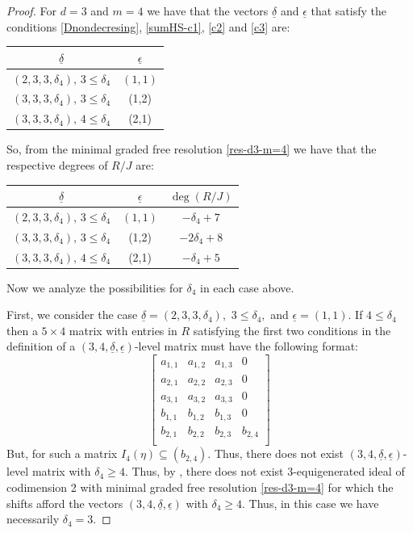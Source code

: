 \documentclass[11pt]{amsart} %
\theoremstyle{definition}
\begin{document}
	\begin{proof}   For $d=3$ and $m=4$ we have that the vectors $\underline{\delta}$ and  $\underline{\epsilon}$ that  satisfy the conditions \eqref{Dnondecresing}, \eqref{sumHS-c1}, \eqref{c2} and \eqref{c3} are:
		
	
			\begin{center}
				\begin{tabular}{|c|c|}
					\hline
					$\underline{\delta}$&$\underline{\epsilon}$\\
					\hline
					$(2,3,3,\delta_4),\,3\leq \delta_4$&$(1,1)$\\
					$(3,3,3,\delta_4),\,3\leq \delta_4$&(1,2)\\
					$(3,3,3,\delta_4),\, 4\leq \delta_4$&(2,1)\\
					\hline
				\end{tabular}
			\end{center}
		So, from  the minimal graded free resolution \eqref{res-d3-m=4} we have that the respective degrees  of $R/J$ are:
		
	
		\begin{center}
			\begin{tabular}{|c|c|c|}
				\hline
				$\underline{\delta}$&$\underline{\epsilon}$&$\deg(R/J)$\\
				\hline
				$(2,3,3,\delta_4),\,3\leq \delta_4$&$(1,1)$&$-\delta_4+7$\\
				$(3,3,3,\delta_4),\,3\leq \delta_4$&(1,2)&$-2\delta_4+8$\\
				$(3,3,3,\delta_4),\, 4\leq \delta_4$&(2,1)&$-\delta_4+5$\\
				\hline
			\end{tabular}
		\end{center}
	
	Now we analyze the possibilities for $\delta_4$ in each case above.
	
	First, we consider the case $\underline{\delta}=(2,3,3,\delta_4),$ $3\leq \delta_4,$ and $\underline{\epsilon}=(1,1)$. If $4\leq \delta_4$  then a $5\times 4$ matrix with entries in $R$ satisfying the first two conditions in the definition
	of a $(3,4,\underline{\delta},\underline{\epsilon})$-level matrix
	must have the following format:
	$$\left[\begin{matrix}
	a_{1,1}&a_{1,2}&a_{1,3}&0\\	
	a_{2,1}&a_{2,2}&a_{2,3}&0\\
	a_{3,1}&a_{3,2}&a_{3,3}&0\\
	b_{1,1}&b_{1,2}&b_{1,3}&0\\
	b_{2,1}&b_{2,2}&b_{2,3}&b_{2,4}\\
	\end{matrix}\right]$$
But, for such a matrix $I_4(\eta)\subseteq(b_{2,4})$. Thus, there does not exist  $(3,4,\underline{\delta},\underline{\epsilon})$-level matrix with $\delta_4\geq 4$.  Thus, by \cite[Theorem 1.3]{BFRS}, there does not exist $3$-equigenerated ideal of codimension 2  with minimal graded free resolution \eqref{res-d3-m=4}  for which the shifts  afford the
vectors $(3,4,\underline{\delta},\underline{\epsilon})$ with  $\delta_4\geq 4$. Thus, in this case we have necessarily $\delta_4=3.$


\end{proof}
\end{document}
